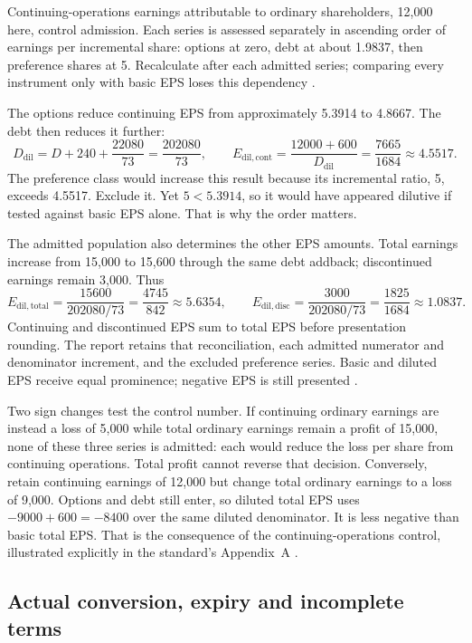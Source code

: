 Continuing-operations earnings attributable to ordinary shareholders,
12,000 here, control admission. Each series is assessed separately in
ascending order of earnings per incremental share: options at zero,
debt at about 1.9837, then preference shares at 5. Recalculate after each
admitted series; comparing every instrument only with basic EPS loses
this dependency \citep[IAS~33, paragraphs 41--44]{eu20231803}.

The options reduce continuing EPS from approximately 5.3914 to 4.8667.
The debt then reduces it further:
\[
 D_{\mathrm{dil}}=D+240+\frac{22080}{73}
                 =\frac{202080}{73},
 \qquad
 E_{\mathrm{dil,cont}}
   =\frac{12000+600}{D_{\mathrm{dil}}}
   =\frac{7665}{1684}\approx4.5517.
\]
The preference class would increase this result because its incremental
ratio, 5, exceeds 4.5517. Exclude it. Yet $5<5.3914$, so it would have
appeared dilutive if tested against basic EPS alone. That is why the
order matters.

The admitted population also determines the other EPS amounts. Total
earnings increase from 15,000 to 15,600 through the same debt addback;
discontinued earnings remain 3,000. Thus
\[
 E_{\mathrm{dil,total}}=\frac{15600}{202080/73}
       =\frac{4745}{842}\approx5.6354,\qquad
 E_{\mathrm{dil,disc}}=\frac{3000}{202080/73}
       =\frac{1825}{1684}\approx1.0837.
\]
Continuing and discontinued EPS sum to total EPS before presentation
rounding. The report retains that reconciliation, each admitted numerator
and denominator increment, and the excluded preference series. Basic and
diluted EPS receive equal prominence; negative EPS is still presented
\citep[IAS~33, paragraphs 66--70]{eu20231803}.

Two sign changes test the control number. If continuing ordinary earnings
are instead a loss of 5,000 while total ordinary earnings remain a profit
of 15,000, none of these three series is admitted: each would reduce the
loss per share from continuing operations. Total profit cannot reverse
that decision. Conversely, retain continuing earnings of 12,000 but
change total ordinary earnings to a loss of 9,000. Options and debt still
enter, so diluted total EPS uses $-9000+600=-8400$ over the same diluted
denominator. It is less negative than basic total EPS. That is the
consequence of the continuing-operations control, illustrated explicitly
in the standard's Appendix~A
\citep[IAS~33, paragraphs 41--43 and A3]{eu20231803}.

\subsection{Actual conversion, expiry and incomplete terms}

